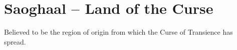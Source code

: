 \section{Saoghaal -- Land of the Curse}\label{sec:saoghaal}
Believed to be the region of origin from which the Curse of Transience has spread.








